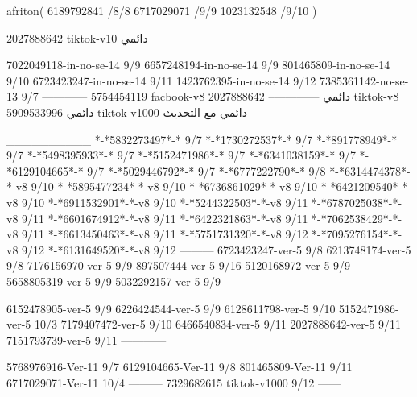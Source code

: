 afriton(
6189792841 /8/8
6717029071 /9/9
1023132548 /9/10
)

2027888642 tiktok-v10
دائمي

7022049118-in-no-se-14 9/9
6657248194-in-no-se-14 9/9
801465809-in-no-se-14 9/10
6723423247-in-no-se-14 9/11
1423762395-in-no-se-14 9/12
7385361142-no-se-13
9/7
------------
5754454119 facbook-v8
دائمي
--------------
2027888642 tiktok-v8
دائمي
5909533996 tiktok-v1000
دائمي مع التحديث

__________
*-*5832273497*-* 9/7
*-*1730272537*-* 9/7
*-*891778949*-* 9/7
*-*5498395933*-* 9/7
*-*5152471986*-* 9/7
*-*6341038159*-* 9/7
*-*6129104665*-* 9/7
*-*5029446792*-* 9/7
*-*6777222790*-* 9/8
*-*6314474378*-*-v8 9/10
*-*5895477234*-*-v8 9/10
*-*6736861029*-*-v8 9/10
*-*6421209540*-*-v8 9/10
*-*6911532901*-*-v8 9/10
*-*5244322503*-*-v8 9/11
*-*6787025038*-*-v8 9/11
*-*6601674912*-*-v8 9/11
*-*6422321863*-*-v8 9/11
*-*7062538429*-*-v8 9/11
*-*6613450463*-*-v8 9/11
*-*5751731320*-*-v8 9/12
*-*7095276154*-*-v8 9/12
*-*6131649520*-*-v8 9/12
---------
6723423247-ver-5 9/8
6213748174-ver-5 9/8
7176156970-ver-5 9/9
897507444-ver-5 9/16
5120168972-ver-5 9/9
5658805319-ver-5 9/9
5032292157-ver-5 9/9

6152478905-ver-5 9/9
6226424544-ver-5 9/9
6128611798-ver-5 9/10
5152471986-ver-5 10/3
7179407472-ver-5 9/10
6466540834-ver-5 9/11
2027888642-ver-5 9/11
7151793739-ver-5 9/11
------------

5768976916-Ver-11
9/7
6129104665-Ver-11
9/8
801465809-Ver-11
9/11
6717029071-Ver-11
10/4
---------
7329682615 tiktok-v1000
9/12
------
